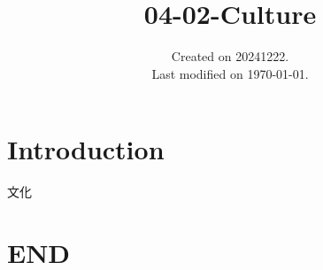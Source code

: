 \documentclass[UTF8]{../../ApplicationUniverse}
\begin{document}
\title{04-02-Culture}
\date{Created on 20241222.\\   Last modified on \today.}
\maketitle
\tableofcontents


\chapter{Introduction}


文化 





\chapter{END}
\end{document}
